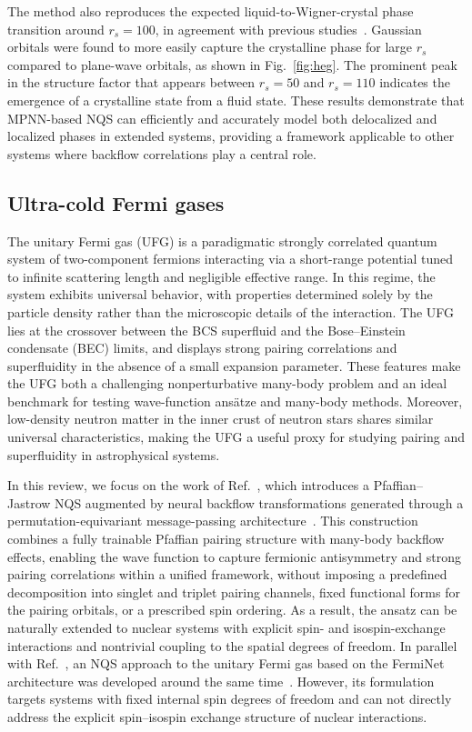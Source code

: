The method also reproduces the expected liquid-to-Wigner-crystal phase transition around $r_s = 100$, in agreement with previous studies~\cite{azadi_correlation_2023,drummond_diffusion_2004, ceperley_ground_1980}. Gaussian orbitals were found to more easily capture the crystalline phase for large $r_s$ compared to plane-wave orbitals, as shown in Fig.~\ref{fig:heg}. The prominent peak in the structure factor that appears between $r_s = 50$ and $r_s = 110$ indicates the emergence of a crystalline state from a fluid state. These results demonstrate that MPNN-based NQS can efficiently and accurately model both delocalized and localized phases in extended systems, providing a framework applicable to other systems where backflow correlations play a central role.

\subsection{Ultra-cold Fermi gases}
\label{sub:ufg}

The unitary Fermi gas (UFG) is a paradigmatic strongly correlated quantum system of two-component fermions interacting via a short-range potential tuned to infinite scattering length and negligible effective range. In this regime, the system exhibits universal behavior, with properties determined solely by the particle density rather than the microscopic details of the interaction. The UFG lies at the crossover between the BCS superfluid and the Bose--Einstein condensate (BEC) limits, and displays strong pairing correlations and superfluidity in the absence of a small expansion parameter. These features make the UFG both a challenging nonperturbative many-body problem and an ideal benchmark for testing wave-function ans\"atze and many-body methods. Moreover, low-density neutron matter in the inner crust of neutron stars shares similar universal characteristics, making the UFG a useful proxy for studying pairing and superfluidity in astrophysical systems.

In this review, we focus on the work of Ref.~\cite{kim_neural-network_2024}, which introduces a Pfaffian--Jastrow NQS augmented by neural backflow transformations generated through a permutation-equivariant message-passing architecture~\cite{pescia_message-passing_2024}. This construction combines a fully trainable Pfaffian pairing structure with many-body backflow effects, enabling the wave function to capture fermionic antisymmetry and strong pairing correlations within a unified framework, without imposing a predefined decomposition into singlet and triplet pairing channels, fixed functional forms for the pairing orbitals, or a prescribed spin ordering. As a result, the ansatz can be naturally extended to nuclear systems with explicit spin- and isospin-exchange interactions and nontrivial coupling to the spatial degrees of freedom. In parallel with  Ref.~\cite{kim_neural-network_2024}, an NQS approach to the unitary Fermi gas based on the FermiNet architecture was developed around the same time~\cite{lou_neural_2024}. However, its formulation targets systems with fixed internal spin degrees of freedom and can not directly address the explicit spin--isospin exchange structure of nuclear interactions.

